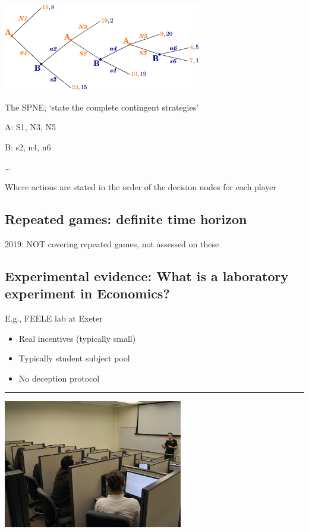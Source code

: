 \documentclass[]{article}
\providecommand{\tightlist}{%
  \setlength{\itemsep}{0pt}\setlength{\parskip}{0pt}}
\begin{document}
\includegraphics[height=1.5in]{picsfigs/longgamework_randompayoffs_ul.png}

The SPNE; `state the complete contingent strategies'

A: S1, N3, N5

B: s2, n4, n6

\bigskip

\ldots{}

Where actions are stated in the order of the decision nodes for each
player

\hypertarget{repeated-games-definite-time-horizon}{%
\subsection{Repeated games: definite time
horizon}\label{repeated-games-definite-time-horizon}}

2019: NOT covering repeated games, not assessed on these

\hypertarget{experimental-evidence-what-is-a-laboratory-experiment-in-economics}{%
\subsection{Experimental evidence: What is a laboratory experiment in
Economics?}\label{experimental-evidence-what-is-a-laboratory-experiment-in-economics}}

E.g., FEELE lab at Exeter

\begin{itemize}
\tightlist
\item
  Real incentives (typically small)
\item
  Typically student subject pool
\item
  No deception protocol
\end{itemize}

\begin{center}\rule{0.5\linewidth}{\linethickness}\end{center}

\includegraphics[height=2.2in]{picsfigs/expeconlab.jpg}
\end{document}
